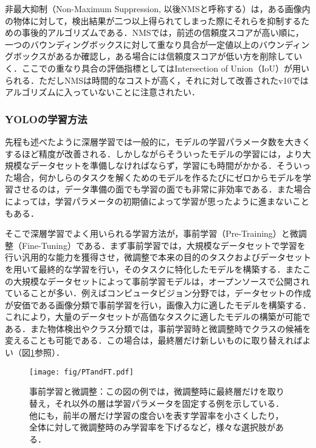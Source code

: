     非最大抑制（Non-Maximum Suppression, 以後NMSと呼称する）は，ある画像内の物体に対して，検出結果が二つ以上得られてしまった際にそれらを抑制するための事後的アルゴリズムである．NMSでは，前述の信頼度スコアが高い順に，一つのバウンディングボックスに対して重なり具合が一定値以上のバウンディングボックスがあるか確認し，ある場合には信頼度スコアが低い方を削除していく．ここでの重なり具合の評価指標としてはIntersection of Union（IoU）が用いられる．ただしNMSは時間的なコストが高く，それに対して改善されたv10ではアルゴリズムに入っていないことに注意されたい．

    \subsubsection{YOLOの学習方法}

    先程も述べたように深層学習では一般的に，モデルの学習パラメータ数を大きくするほど精度が改善される．しかしながらそういったモデルの学習には，より大規模なデータセットを準備しなければならず，学習にも時間がかかる．そういった場合，何かしらのタスクを解くためのモデルを作るたびにゼロからモデルを学習させるのは，データ準備の面でも学習の面でも非常に非効率である．また場合によっては，学習パラメータの初期値によって学習が思ったように進まないこともある．

    そこで深層学習でよく用いられる学習方法が，事前学習（Pre-Training）と微調整（Fine-Tuning）である\cite{radford2018improving}．まず事前学習では，大規模なデータセットで学習を行い汎用的な能力を獲得させ，微調整で本来の目的のタスクおよびデータセットを用いて最終的な学習を行い，そのタスクに特化したモデルを構築する．またこの大規模なデータセットによって事前学習モデルは，オープンソースで公開されていることが多い．例えばコンピュータビジョン分野では，データセットの作成が安価である画像分類で事前学習を行い，画像入力に適したモデルを構築する．これにより，大量のデータセットが高価なタスクに適したモデルの構築が可能である．また物体検出やクラス分類では，事前学習時と微調整時でクラスの候補を変えることも可能である．この場合は，最終層だけ新しいものに取り替えればよい（図\ref{fig:PTandFT}参照）．

    \begin{figure}[t]
        \centering    
        \texttt{[image: fig/PTandFT.pdf]}
        \caption[事前学習と微調整]{事前学習と微調整：この図の例では，微調整時に最終層だけを取り替え，それ以外の層は学習パラメータを固定する例を示している．他にも，前半の層だけ学習の度合いを表す学習率を小さくしたり，全体に対して微調整時のみ学習率を下げるなど，様々な選択肢がある．}
        \label{fig:PTandFT}
    \end{figure}

